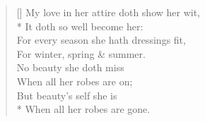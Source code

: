 \documentclass[MAIN]{subfiles}
\begin{document}
\settowidth{\versewidth}{My love in her attire doth show her wit,}
\begin{verse}[\versewidth]
My love in her attire doth show her wit,\\*
\vin It doth so well become her:\\
For every season she hath dressings fit,\\
\vin For winter, spring \& summer.\\
No beauty she doth miss\\
When all her robes are on;\\
But beauty's self she is\\*
When all her robes are gone.
\end{verse}
\end{document}
